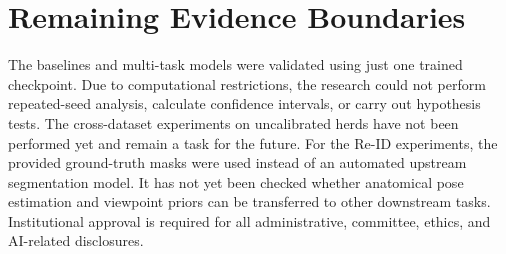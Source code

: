 \section{Remaining Evidence Boundaries}

The baselines and multi-task models were validated using just one trained checkpoint. Due to computational restrictions, the research could not perform repeated-seed analysis, calculate confidence intervals, or carry out hypothesis tests. The cross-dataset experiments on uncalibrated herds have not been performed yet and remain a task for the future. For the Re-ID experiments, the provided ground-truth masks were used instead of an automated upstream segmentation model. It has not yet been checked whether anatomical pose estimation and viewpoint priors can be transferred to other downstream tasks. Institutional approval is required for all administrative, committee, ethics, and AI-related disclosures.

